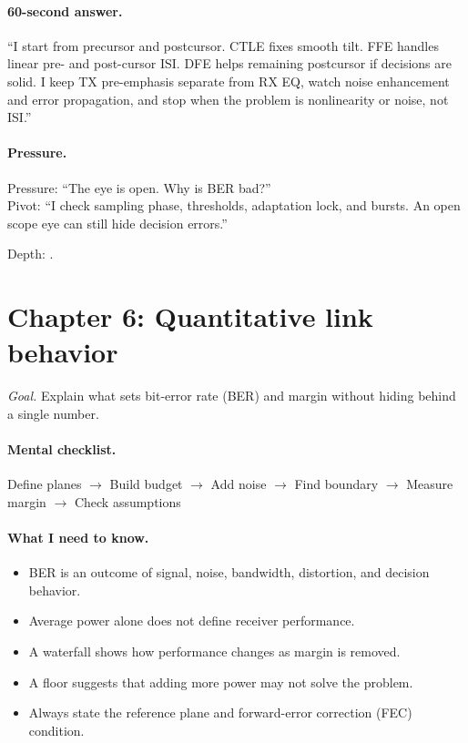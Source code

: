 \paragraph{60-second answer.}
``I start from precursor and postcursor. CTLE fixes smooth tilt. FFE handles
linear pre- and post-cursor ISI. DFE helps remaining postcursor if decisions are
solid. I keep TX pre-emphasis separate from RX EQ, watch noise enhancement and
error propagation, and stop when the problem is nonlinearity or noise, not
ISI.''

\paragraph{Pressure.}
Pressure: ``The eye is open. Why is BER bad?''\\
Pivot: ``I check sampling phase, thresholds, adaptation lock, and bursts. An
open scope eye can still hide decision errors.''

\footnotesize Depth: .

\clearpage
\section{Chapter 6: Quantitative link behavior}
\label{sec:cheat-ch4}

\textit{Goal.} Explain what sets bit-error rate (BER) and margin without hiding
behind a single number.

\paragraph{Mental checklist.}
Define planes $\rightarrow$ Build budget $\rightarrow$ Add noise $\rightarrow$
Find boundary $\rightarrow$ Measure margin $\rightarrow$ Check assumptions

\paragraph{What I need to know.}
\begin{itemize}
\item BER is an outcome of signal, noise, bandwidth, distortion, and decision
      behavior.
\item Average power alone does not define receiver performance.
\item A waterfall shows how performance changes as margin is removed.
\item A floor suggests that adding more power may not solve the problem.
\item Always state the reference plane and forward-error correction (FEC)
      condition.
\end{itemize}

